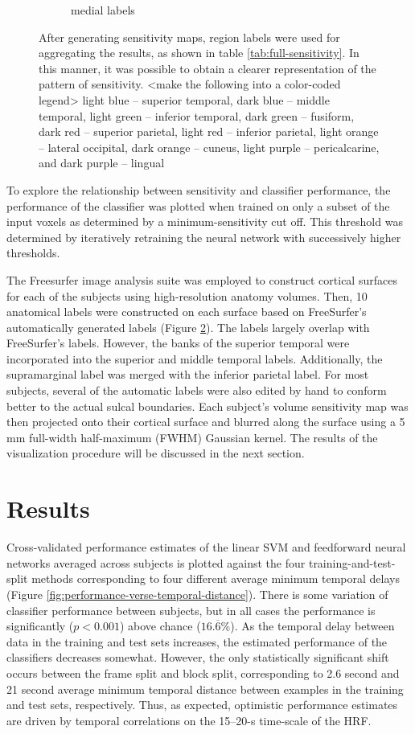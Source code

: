 \documentclass[review,1p,authoryear]{elsarticle}
\begin{document}
\begin{figure}
\begin{subfigure}{0.3\textwidth}
\caption{medial labels}
\label{fig:medial-labels}
\end{subfigure}
\caption{After generating sensitivity maps, region labels were used for aggregating the results, as shown in table \ref{tab:full-sensitivity}. In this manner, it was possible to obtain a clearer representation of the pattern of sensitivity. <make the following into a color-coded legend> light blue -- superior temporal, dark blue -- middle temporal, light green -- inferior temporal, dark green -- fusiform, dark red -- superior parietal, light red -- inferior parietal, light orange -- lateral occipital, dark orange -- cuneus, light purple -- pericalcarine, and dark purple -- lingual}
\label{fig:labels}
\end{figure}

To  explore the relationship between sensitivity and classifier performance, the performance of the classifier was plotted when trained on only a subset of the input voxels as determined by a minimum-sensitivity cut off.
This threshold was determined by iteratively retraining the neural network with successively higher thresholds.

The Freesurfer image analysis suite was employed to construct cortical surfaces for each of the subjects using high-resolution anatomy volumes.
Then, 10 anatomical labels were constructed on each surface based on FreeSurfer's automatically generated labels (Figure \ref{fig:labels}).
The labels largely overlap with FreeSurfer's labels.
However, the banks of the superior temporal were incorporated into the superior and middle temporal labels.
Additionally, the supramarginal label was merged with the inferior parietal label.
For most subjects, several of the automatic labels were also edited by hand to conform better to the actual sulcal boundaries.
Each subject's volume sensitivity map was then projected onto their cortical surface and blurred along the surface using a 5 mm full-width half-maximum (FWHM) Gaussian kernel.
The results of the visualization procedure will be discussed in the next section.

\section{Results}
Cross-validated performance estimates of the linear SVM and feedforward neural networks averaged across subjects is plotted against the four training-and-test-split methods corresponding to four different average minimum temporal delays (Figure \ref{fig:performance-verse-temporal-distance}).
There is some variation of classifier performance between subjects, but in all cases the performance is significantly ($p < 0.001$) above chance ($16.\overline{6}$\%). 
As the temporal delay between data in the training and test sets increases, the estimated performance of the classifiers decreases somewhat.
However, the only statistically significant shift occurs between the frame split and block split, corresponding to 2.6 second and 21 second average minimum temporal distance between examples in the training and test sets, respectively.
Thus, as expected, optimistic performance estimates are driven by temporal correlations on the 15--20-s time-scale of the HRF.
\end{document}
